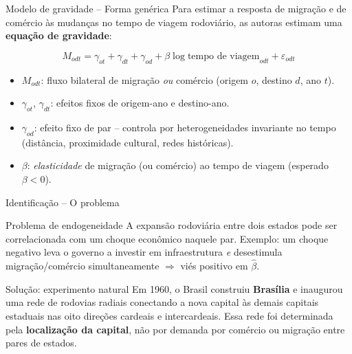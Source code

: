 \begin{frame}{Modelo de gravidade -- Forma genérica}
    Para estimar a resposta de migração e de comércio às mudanças no tempo de viagem rodoviário, as autoras estimam uma \textbf{equação de gravidade}:

    \begin{equation}\label{eq:gravity}
        M_{odt} = \gamma_{ot} + \gamma_{dt} + \gamma_{od}
                  + \beta \log \text{tempo de viagem}_{odt} + \varepsilon_{odt}
    \end{equation}

    \vspace{0.15cm}

    \begin{itemize}
        \item $M_{odt}$: fluxo bilateral de migração \textit{ou} comércio (origem $o$, destino $d$, ano $t$).
        \item $\gamma_{ot}$, $\gamma_{dt}$: efeitos fixos de origem-ano e destino-ano.
        \item $\gamma_{od}$: efeito fixo de par -- controla por heterogeneidades invariante no tempo (distância, proximidade cultural, redes históricas).
        \item $\beta$: \textit{elasticidade} de migração (ou comércio) ao tempo de viagem (esperado $\beta < 0$).
    \end{itemize}
\end{frame}

\begin{frame}{Identificação -- O problema}
    \begin{block}{Problema de endogeneidade}
        A expansão rodoviária entre dois estados pode ser correlacionada com um choque econômico naquele par. Exemplo: um choque negativo leva o governo a investir em infraestrutura \textit{e} desestimula migração/comércio simultaneamente $\Rightarrow$ viés positivo em $\hat\beta$.
    \end{block}

    \vspace{0.4cm}

    \begin{block}{Solução: experimento natural}
        Em 1960, o Brasil construiu \textbf{Brasília} e inaugurou uma rede de rodovias radiais conectando a nova capital às demais capitais estaduais nas oito direções cardeais e intercardeais. Essa rede foi determinada pela \textbf{localização da capital}, não por demanda por comércio ou migração entre pares de estados.
    \end{block}
\end{frame}

